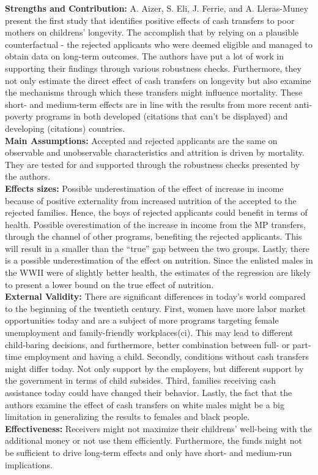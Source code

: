 \textbf{Strengths and Contribution:} A. Aizer, S. Eli, J. Ferrie, and A. Lleras-Muney present the first study that identifies positive effects of cash transfers to poor mothers on childrens' longevity. The accomplish that by relying on a plausible counterfactual - the rejected applicants who were deemed eligible and managed to obtain data on long-term outcomes. The authors have put a lot of work in supporting their findings through various robustness checks. Furthermore, they not only estimate the direct effect of cash transfers on longevity but also examine the mechanisms through which these transfers might influence mortality. These short- and medium-term effects are in line with the results from more recent anti-poverty programs in both developed (citations that can't be displayed) and developing (citations) countries.\\
\textbf{Main Assumptions:} Accepted and rejected applicants are the same on observable and unobservable characteristics and attrition is driven by mortality. They are tested for and supported through the robustness checks presented by the authors.   \\
\textbf{Effects sizes:} Possible underestimation of the effect of increase in income because of positive
externality from increased nutrition of the accepted to the rejected families. Hence, the boys of rejected applicants could benefit in terms of health. Possible overestimation of the increase in income from the MP transfers, through the channel of other programs, benefiting the rejected applicants. This will result in a smaller than the ``true'' gap between the two groups. Lastly, there is a possible underestimation of the effect on nutrition. Since the enlisted males in the WWII were of slightly better health, the estimates of the regression are likely to present a lower bound on the true effect of nutrition. \\
\textbf{External Validity:} There are significant differences in today's world compared to the beginning of the twentieth century. First, women have more labor market opportunities today and are a subject of more programs targeting female unemployment and family-friendly workplaces(ci). This may lead to different child-baring decisions, and furthermore, better combination between full- or part-time employment and having a child. Secondly, conditions without cash transfers might differ today. Not only support by the employers, but different support by the government in terms of child subsides. Third, families receiving cash assistance today could have changed their behavior. Lastly, the fact that the authors examine the effect of cash transfers on white males might be a big limitation in generalizing the results to females and black people.\\   
\textbf{Effectiveness:} Receivers might not maximize their childrens' well-being with the additional money or not use them efficiently. Furthermore, the funds might not be sufficient to drive long-term effects and only have short- and medium-run implications. 